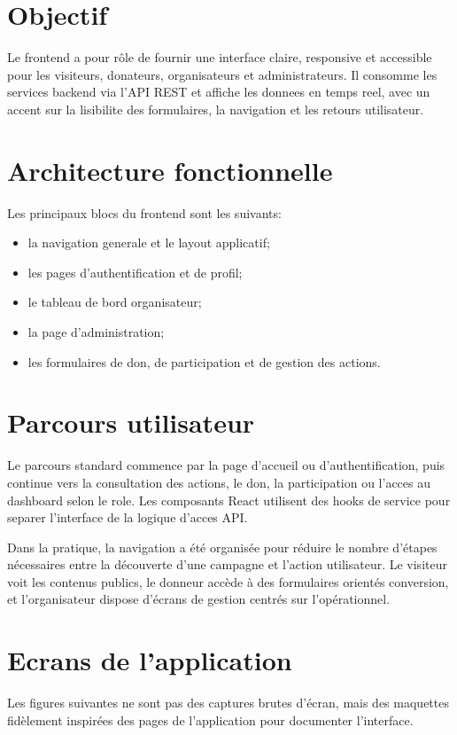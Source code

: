 \documentclass[12pt,a4paper]{report}
\begin{document}
\section{Objectif}
Le frontend a pour rôle de fournir une interface claire, responsive et accessible pour les visiteurs, donateurs, organisateurs et administrateurs.
Il consomme les services backend via l'API REST et affiche les donnees en temps reel, avec un accent sur la lisibilite des formulaires, la navigation et les retours utilisateur.

\section{Architecture fonctionnelle}
Les principaux blocs du frontend sont les suivants:
\begin{itemize}[leftmargin=1.2cm]
  \item la navigation generale et le layout applicatif;
  \item les pages d'authentification et de profil;
  \item le tableau de bord organisateur;
  \item la page d'administration;
  \item les formulaires de don, de participation et de gestion des actions.
\end{itemize}

\section{Parcours utilisateur}
Le parcours standard commence par la page d'accueil ou d'authentification, puis continue vers la consultation des actions, le don, la participation ou l'acces au dashboard selon le role.
Les composants React utilisent des hooks de service pour separer l'interface de la logique d'acces API.

Dans la pratique, la navigation a été organisée pour réduire le nombre d'étapes nécessaires entre la découverte d'une campagne et l'action utilisateur. Le visiteur voit les contenus publics, le donneur accède à des formulaires orientés conversion, et l'organisateur dispose d'écrans de gestion centrés sur l'opérationnel.

\section{Ecrans de l'application}
Les figures suivantes ne sont pas des captures brutes d'écran, mais des maquettes fidèlement inspirées des pages de l'application pour documenter l'interface.
\end{document}
